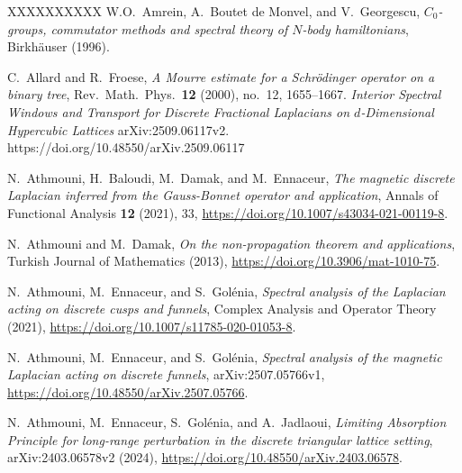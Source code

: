 \documentclass[10pt]{amsart}
\newcommand{\1}{{\mathbb{I}}}
\numberwithin{equation}{section}
\begin{document}
\begin{thebibliography}{XXXXXXXXXX}
 W.O.\ Amrein, A.\ Boutet de Monvel, and V.\ Georgescu, \emph{$C_0$-groups, commutator methods and spectral theory of $N$-body hamiltonians}, Birkh\"auser (1996).

 C.\ Allard and R.\ Froese, \emph{A Mourre estimate for a Schr\"{o}dinger operator on a binary tree}, Rev.\ Math.\ Phys.\ {\bf 12} (2000), no.\ 12, 1655--1667.
\emph{Interior Spectral Windows and Transport for Discrete Fractional Laplacians on $d$-Dimensional Hypercubic Lattices} arXiv:2509.06117v2. https://doi.org/10.48550/arXiv.2509.06117

 N.\ Athmouni, H.\ Baloudi, M.\ Damak, and M.\ Ennaceur, \emph{The magnetic discrete Laplacian inferred from the Gauss-Bonnet operator and application}, Annals of Functional Analysis {\bf 12} (2021), 33, \url{https://doi.org/10.1007/s43034-021-00119-8}.

 N.\ Athmouni and M.\ Damak, \emph{On the non-propagation theorem and applications}, Turkish Journal of Mathematics (2013), \url{https://doi.org/10.3906/mat-1010-75}.

 N.\ Athmouni, M.\ Ennaceur, and S.\ Gol\'enia, \emph{Spectral analysis of the Laplacian acting on discrete cusps and funnels}, Complex Analysis and Operator Theory (2021), \url{https://doi.org/10.1007/s11785-020-01053-8}.

 N.\ Athmouni, M.\ Ennaceur, and S.\ Gol\'enia, \emph{Spectral analysis of the magnetic Laplacian acting on discrete funnels}, arXiv:2507.05766v1, \url{https://doi.org/10.48550/arXiv.2507.05766}.

 N.\ Athmouni, M.\ Ennaceur, S.\ Gol\'enia, and A.\ Jadlaoui, \emph{Limiting Absorption Principle for long-range perturbation in the discrete triangular lattice setting}, arXiv:2403.06578v2 (2024), \url{https://doi.org/10.48550/arXiv.2403.06578}.


\end{thebibliography}
\end{document}
